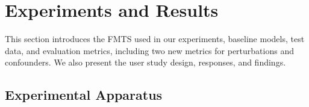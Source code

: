 \section{Experiments and Results}

This section introduces the FMTS used in our experiments, baseline models, test data, and evaluation metrics, including two new metrics for perturbations and confounders. We also present the user study design, responses, and findings.


\subsection{Experimental Apparatus}
\label{sec:exp_app}




